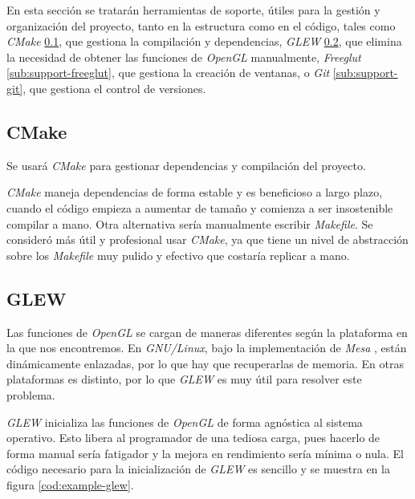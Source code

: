 En esta sección se tratarán herramientas de soporte, útiles para la gestión y organización del proyecto, tanto en la estructura como en el código, tales como \textit{CMake} \ref{sub:support-cmake}, que gestiona la compilación y dependencias, \textit{GLEW} \ref{sub:support-glew}, que elimina la necesidad de obtener las funciones de \textit{OpenGL} manualmente, \textit{Freeglut} \ref{sub:support-freeglut}, que gestiona la creación de ventanas, o \textit{Git} \ref{sub:support-git}, que gestiona el control de versiones.

\subsection{CMake} \label{sub:support-cmake}
Se usará \textit{CMake} \cite{webCMakeDocs} para gestionar dependencias y compilación del proyecto.

\textit{CMake} maneja dependencias de forma estable y es beneficioso a largo plazo, cuando el código empieza a aumentar de tamaño y comienza a ser insostenible compilar a mano. Otra alternativa sería manualmente escribir \textit{Makefile}. Se consideró más útil y profesional usar \textit{CMake}, ya que tiene un nivel de abstracción sobre los \textit{Makefile} muy pulido y efectivo que costaría replicar a mano.

\FloatBarrier
\subsection{GLEW} \label{sub:support-glew}
Las funciones de \textit{OpenGL} se cargan de maneras diferentes según la plataforma en la que nos encontremos. En \textit{GNU/Linux}, bajo la implementación de \textit{Mesa} \cite{webMesaDocs}, están dinámicamente enlazadas, por lo que hay que recuperarlas de memoria. En otras plataformas es distinto, por lo que \textit{GLEW} es muy útil para resolver este problema.

\textit{GLEW} \cite{webGLEW} inicializa las funciones de \textit{OpenGL} de forma agnóstica al sistema operativo. Esto libera al programador de una tediosa carga, pues hacerlo de forma manual sería fatigador y la mejora en rendimiento sería mínima o nula. El código necesario para la inicialización de \textit{GLEW} es sencillo y se muestra en la figura \ref{cod:example-glew}.



